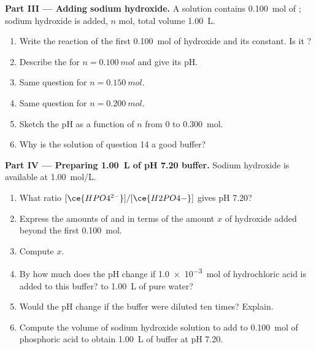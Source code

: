\begin{problem}
\medskip
\noindent\textbf{Part III --- Adding sodium hydroxide.}
A solution contains \qty{0.100}{mol} of ; sodium hydroxide is
added, $n$ mol, total volume \qty{1.00}{L}.
\begin{enumerate}[resume]
  \item Write the reaction of the first \qty{0.100}{mol} of hydroxide and
        its constant. Is it ?
  \item Describe the  for $n = \qty{0.100}{mol}$ and give
        its pH.
  \item Same question for $n = \qty{0.150}{mol}$.
  \item Same question for $n = \qty{0.200}{mol}$.
  \item Sketch the pH as a function of $n$ from 0 to \qty{0.300}{mol}.
  \item Why is the solution of question 14 a good buffer?
\end{enumerate}

\medskip
\noindent\textbf{Part IV --- Preparing \qty{1.00}{L} of pH 7.20 buffer.}
Sodium hydroxide is available at \qty{1.00}{mol/L}.
\begin{enumerate}[resume]
  \item What ratio $[\ce{HPO4^{2-}}]/[\ce{H2PO4-}]$ gives pH 7.20?
  \item Express the amounts of  and  in terms of the
        amount $x$ of hydroxide added beyond the first \qty{0.100}{mol}.
  \item Compute $x$.
  \item By how much does the pH change if \qty{1.0e-3}{mol} of hydrochloric
        acid is added to this buffer? to \qty{1.00}{L} of pure water?
  \item Would the pH change if the buffer were diluted ten times? Explain.
  \item Compute the volume of sodium hydroxide solution to add to
        \qty{0.100}{mol} of phosphoric acid to obtain \qty{1.00}{L} of
        buffer at pH 7.20.
\end{enumerate}
\end{problem}
